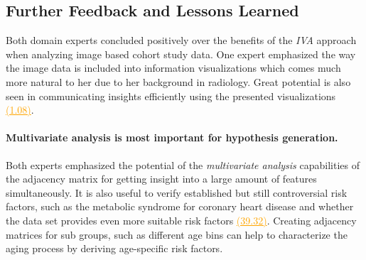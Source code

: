 \documentclass[journal]{style/vgtc} 			          %
\newcommand{\com}[1]{\textcolor{orange}{\uline{#1}}}
\begin{document}

\subsection{Further Feedback and Lessons Learned} \label{Lessons Learned}
%
Both domain experts concluded positively over the benefits of the \emph{IVA} approach when analyzing image based cohort study data.
%
One expert emphasized the way the image data is included into information visualizations which comes much more natural to her due to her background in radiology.
%
%
Great potential is also seen in communicating insights efficiently using the presented visualizations \com{(1.08)}.
%
\paragraph{Multivariate analysis is most important for hypothesis generation.}
Both experts emphasized the potential of the \emph{multivariate analysis} capabilities of the adjacency matrix for getting insight into a large amount of features simultaneously.
%
It is also useful to verify established but still controversial risk factors, such as the metabolic syndrome for coronary heart disease and whether the data set provides even more suitable risk factors \com{(39.32)}.
%
Creating adjacency matrices for sub groups, such as different age bins can help to characterize the aging process by deriving age-specific risk factors.
\end{document}
